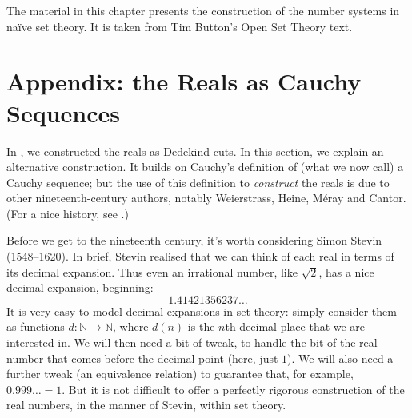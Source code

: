 \documentclass[10pt,a4paper]{article}
\makeatletter
\theoremstyle{plain}
\theoremstyle{definition}
\theoremstyle{remark}
\newenvironment{editorial}{}{}
\newcommand*{\olfileid}[3]{}
\newcommand*{\olsection}[1]{\section*{#1}}
\newcommand*{\olchapter}[3]{}
\newcommand*{\olimport}[1]{}
\newcommand{\olref}{\@ifnextchar[{\olref@i}{\olref@final}}
\def\olref@i[#1]{\@ifnextchar[{\olref@ii}{\olref@final}}
\def\olref@ii[#1]{\@ifnextchar[{\olref@iii}{\olref@final}}
\def\olref@iii[#1]{\olref@final}
\def\olref@final#1{\ref{#1}}
\providecommand{\Nat}{\ensuremath{\mathbb{N}}}
\providecommand{\citeauthor}[1]{\cite{#1}}
\providecommand{\citeyear}[1]{\cite{#1}}
\makeatother
\begin{document}


	
\olchapter{sfr}{arith}{Arithmetization}

\begin{editorial}
The material in this chapter presents the construction of the number
systems in na\"ive set theory. It is taken from Tim Button's Open Set
Theory text.
\end{editorial}

\olimport{integers}
\olimport{rationals}
\olimport{reals}
\olimport{cuts}
\olimport{reflections}
\olimport{checking-details}
\olimport{cauchy}

\OLEndChapterHook





\olfileid{sfr}{arith}{cauchy}

\olsection{Appendix: the Reals as Cauchy Sequences}

In \olref[cuts]{sec}, we constructed the reals as Dedekind cuts. In
this section, we explain an alternative construction. It builds on
Cauchy's definition of (what we now call) a Cauchy sequence; but the
use of this definition to \emph{construct} the reals is due to other
nineteenth-century authors, notably Weierstrass, Heine, M\'{e}ray and
Cantor. (For a nice history, see \citeauthor{OConnorRobertson:RN}
\citeyear{OConnorRobertson:RN}.)

Before we get to the nineteenth century, it's worth considering Simon
Stevin (1548--1620). In brief, Stevin realised that we can think of
each real in terms of its decimal expansion. Thus even an irrational
number, like $\sqrt{2}$, has a nice decimal expansion, beginning:
\[
	1.41421356237\ldots
\] 
It is very easy to model decimal expansions in set theory: simply
consider them as functions $d \colon \Nat \to \Nat$, where $d(n)$ is
the $n$th decimal place that we are interested in. We will then need a
bit of tweak, to handle the bit of the real number that comes before
the decimal point (here, just $1$). We will also need a further tweak
(an equivalence relation) to guarantee that, for example, $0.999\ldots
= 1$. But it is not difficult to offer a perfectly rigorous
construction of the real numbers, in the manner of Stevin, within set
theory. 
\end{document}
